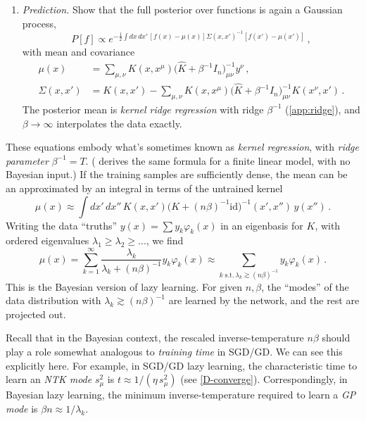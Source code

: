 \documentclass[11pt]{article}
\begin{document}
\begin{exercise}
\begin{enumerate}
    \item \emph{Prediction.} Show that the full posterior over functions is again a Gaussian process,
    \begin{equation}
        P[f] \propto e^{\textstyle -\frac{1}{2} \int dx\,dx'\, [f(x)-\mu(x)] \Sigma(x,x')^{-1} [f(x')-\mu(x')] }\,,
    \end{equation}
    with mean and covariance
    \begin{align*}
        \mu(x) &=  \sum_{\mu,\nu}K(x,x^\mu)\big(\hat K+\beta^{-1}I_n\big)^{-1}_{\mu\nu} y^\nu\,, \\
        \Sigma(x,x') &= K(x,x')-\sum_{\mu,\nu}K(x,x^\mu)\big(\hat K+\beta^{-1}I_n\big)^{-1}_{\mu\nu} K(x^\nu,x')\,.
    \end{align*}
    The posterior mean is \emph{kernel ridge regression} with ridge $\beta^{-1}$ (\cref{app:ridge}), and $\beta\to\infty$ interpolates the data exactly. 
\end{enumerate}
\end{exercise}

These equations embody what's sometimes known as \emph{kernel regression}, with \emph{ridge parameter} $\beta^{-1}=T$. ( derives the same formula for a finite linear model, with no Bayesian input.) If the training samples are sufficiently dense, the mean can be an approximated by an integral in terms of the untrained kernel
%
\begin{equation}
    \mu(x) \approx \int dx'\,dx''\, K(x,x')\big(K+(n\beta)^{-1}\text{id}\big)^{-1}(x',x'')\,y(x'')\,.
\end{equation}
%
Writing the data ``truths'' $y(x) = \sum y_k \varphi_k(x)$ in an eigenbasis for $K$, with ordered eigenvalues $\lambda_1\geq\lambda_2\geq...$, we find
%
\begin{equation}
    \mu(x) = \sum_{k=1}^\infty \frac{\lambda_k}{\lambda_k+(n\beta)^{-1}} y_k\varphi_k(x) \approx \sum_{k\;\text{s.t.}\, \lambda_k\gtrsim(n\beta)^{-1}} y_k\varphi_k(x)\,.
\end{equation}
%
This is the Bayesian version of lazy learning. For given $n,\beta$, the ``modes'' of the data distribution with $\lambda_k \gtrsim (n\beta)^{-1}$ are learned by the network, and the rest are projected out.

Recall that in the Bayesian context, the rescaled inverse-temperature $n\beta$ should play a role somewhat analogous to \emph{training time} in SGD/GD. We can see this explicitly here. For example, in SGD/GD lazy learning, the characteristic time to learn an \emph{NTK mode} $s_\mu^2$ is $t\approx 1/(\eta\,s_\mu^2)$ (see \eqref{D-converge}). Correspondingly, in Bayesian lazy learning, the minimum inverse-temperature required to learn a \emph{GP mode} is $\beta n\approx 1/\lambda_k$.
\end{document}
